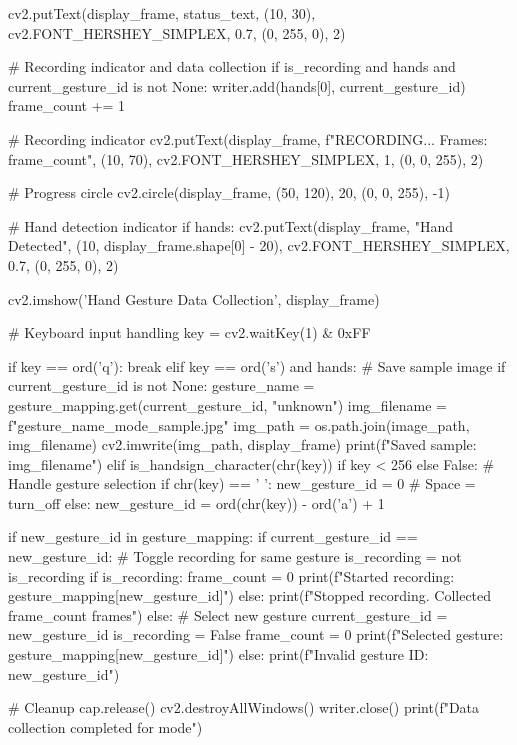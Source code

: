 \begin{aivncodebox}
\begin{python}
        cv2.putText(display_frame, status_text, (10, 30),
                   cv2.FONT_HERSHEY_SIMPLEX, 0.7, (0, 255, 0), 2)
        
        # Recording indicator and data collection
        if is_recording and hands and current_gesture_id is not None:
            writer.add(hands[0], current_gesture_id)
            frame_count += 1
            
            # Recording indicator
            cv2.putText(display_frame, f"RECORDING... Frames: {frame_count}", 
                       (10, 70), cv2.FONT_HERSHEY_SIMPLEX, 1, (0, 0, 255), 2)
            
            # Progress circle
            cv2.circle(display_frame, (50, 120), 20, (0, 0, 255), -1)
        
        # Hand detection indicator
        if hands:
            cv2.putText(display_frame, "Hand Detected", (10, display_frame.shape[0] - 20),
                       cv2.FONT_HERSHEY_SIMPLEX, 0.7, (0, 255, 0), 2)
        
        cv2.imshow('Hand Gesture Data Collection', display_frame)
        
        # Keyboard input handling
        key = cv2.waitKey(1) & 0xFF
        
        if key == ord('q'):
            break
        elif key == ord('s') and hands:
            # Save sample image
            if current_gesture_id is not None:
                gesture_name = gesture_mapping.get(current_gesture_id, "unknown")
                img_filename = f"{gesture_name}_{mode}_sample.jpg"
                img_path = os.path.join(image_path, img_filename)
                cv2.imwrite(img_path, display_frame)
                print(f"Saved sample: {img_filename}")
        elif is_handsign_character(chr(key)) if key < 256 else False:
            # Handle gesture selection
            if chr(key) == ' ':
                new_gesture_id = 0  # Space = turn_off
            else:
                new_gesture_id = ord(chr(key)) - ord('a') + 1
            
            if new_gesture_id in gesture_mapping:
                if current_gesture_id == new_gesture_id:
                    # Toggle recording for same gesture
                    is_recording = not is_recording
                    if is_recording:
                        frame_count = 0
                        print(f"Started recording: {gesture_mapping[new_gesture_id]}")
                    else:
                        print(f"Stopped recording. Collected {frame_count} frames")
                else:
                    # Select new gesture
                    current_gesture_id = new_gesture_id
                    is_recording = False
                    frame_count = 0
                    print(f"Selected gesture: {gesture_mapping[new_gesture_id]}")
            else:
                print(f"Invalid gesture ID: {new_gesture_id}")
    
    # Cleanup
    cap.release()
    cv2.destroyAllWindows()
    writer.close()
    print(f"Data collection completed for {mode}")
\end{python}
\end{aivncodebox}
